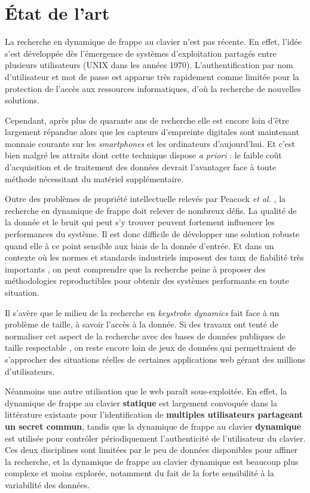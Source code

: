 \section{État de l'art}

La recherche en dynamique de frappe au clavier n'est pas récente\cite{wood1977}. En effet, l'idée s'est développée dès l'émergence de systèmes d'exploitation partagés entre plusieurs utilisateurs (UNIX dans les années 1970). L'authentification par nom d'utilisateur et mot de passe est apparue très rapidement comme limitée pour la protection de l'accès aux ressources informatiques, d'où la recherche de nouvelles solutions.

Cependant, après plus de quarante ans de recherche elle est encore loin d'être largement répandue alors que les capteurs d'empreinte digitales sont maintenant monnaie courante sur les \textit{smartphones} et les ordinateurs d'aujourd'hui. Et c'est bien malgré les attraits dont cette technique dispose \textit{a priori} : le faible coût d'acquisition et de traitement des données devrait l'avantager face à toute méthode nécessitant du matériel supplémentaire.

Outre des problèmes de propriété intellectuelle relevés par Peacock \textit{et al.} \cite{peacock2004}, la recherche en dynamique de frappe doit relever de nombreux défis. La qualité de la donnée et le bruit qui peut s'y trouver peuvent fortement influencer les performances du système. Il est donc difficile de développer une solution robuste quand elle à ce point sensible aux biais de la donnée d'entrée. Et dans un contexte où les normes et standards industriels imposent des taux de fiabilité très importants \cite{killourhy2009}, on peut comprendre que la recherche peine à proposer des méthodologies reproductibles pour obtenir des systèmes performants en toute situation.

Il s'avère que le milieu de la recherche en \textit{keystroke dynamics} fait face à un problème de taille, à savoir l'accès à la donnée. Si des travaux ont tenté de normaliser cet aspect de la recherche avec des bases de données publiques de taille respectable \cite{giotGREYC,killourhy2009}, on reste encore loin de jeux de données qui permettraient de s'approcher des situations réelles de certaines applications web gérant des millions d'utilisateurs.

Néanmoins une autre utilisation que le web paraît sous-exploitée. En effet, la dynamique de frappe au clavier \textbf{statique} est largement convoquée dans la littérature existante pour l'identification de \textbf{multiples utilisateurs partageant un secret commun}, tandis que la dynamique de frappe au clavier \textbf{dynamique} est utilisée pour contrôler périodiquement l'authenticité de l'utilisateur du clavier\cite{gunetti2005}. Ces deux disciplines sont limitées par le peu de données disponibles pour affiner la recherche, et la dynamique de frappe au clavier dynamique est beaucoup plus complexe et moins explorée, notamment du fait de la forte sensibilité à la variabilité des données.

